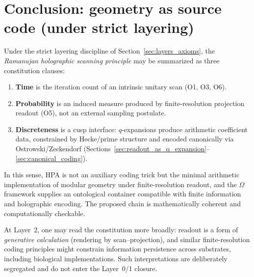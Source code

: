 \section{Conclusion: geometry as source code (under strict layering)}
\label{sec:conclusion}

Under the strict layering discipline of Section~\ref{sec:layers_axioms}, the \emph{Ramanujan holographic scanning principle} may be summarized as three constitution clauses:
\begin{enumerate}
  \item \textbf{Time} is the iteration count of an intrinsic unitary scan (O1, O3, O6).
  \item \textbf{Probability} is an induced measure produced by finite-resolution projection readout (O5), not an external sampling postulate.
  \item \textbf{Discreteness} is a cusp interface: $q$-expansions produce arithmetic coefficient data, constrained by Hecke/prime structure and encoded canonically via Ostrowski/Zeckendorf (Sections~\ref{sec:readout_as_q_expansion}--\ref{sec:canonical_coding}).
\end{enumerate}

In this sense, HPA is not an auxiliary coding trick but the minimal arithmetic implementation of modular geometry under finite-resolution readout, and the $\Omega$ framework supplies an ontological container compatible with finite information and holographic encoding. The proposed chain is mathematically coherent and computationally checkable.

At Layer~2, one may read the constitution more broadly: readout is a form of \emph{generative calculation} (rendering by scan--projection), and similar finite-resolution coding principles might constrain information persistence across substrates, including biological implementations. Such interpretations are deliberately segregated and do not enter the Layer~0/1 closure.

